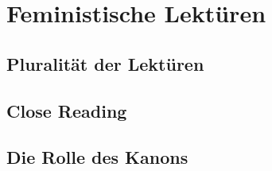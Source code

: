 \section{Feministische Lektüren}

\subsection{Pluralität der Lektüren}

\subsection{Close Reading}

\subsection{Die Rolle des Kanons}
